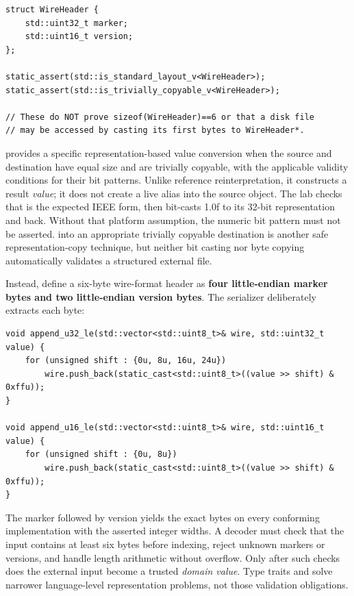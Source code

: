 \begin{verbatim}
struct WireHeader {
    std::uint32_t marker;
    std::uint16_t version;
};

static_assert(std::is_standard_layout_v<WireHeader>);
static_assert(std::is_trivially_copyable_v<WireHeader>);

// These do NOT prove sizeof(WireHeader)==6 or that a disk file
// may be accessed by casting its first bytes to WireHeader*.
\end{verbatim}

 provides a specific representation-based value conversion when the source and destination have equal size and are trivially copyable, with the applicable validity conditions for their bit patterns. Unlike reference reinterpretation, it constructs a result \emph{value}; it does not create a live alias into the source object. The lab checks that  is the expected IEEE form, then bit-casts 1.0f to its 32-bit representation  and back. Without that platform assumption, the numeric bit pattern must not be asserted.  into an appropriate trivially copyable destination is another safe representation-copy technique, but neither bit casting nor byte copying automatically validates a structured external file.

Instead, define a six-byte wire-format header as \textbf{four little-endian marker bytes and two little-endian version bytes}. The serializer deliberately extracts each byte:

\begin{verbatim}
void append_u32_le(std::vector<std::uint8_t>& wire, std::uint32_t value) {
    for (unsigned shift : {0u, 8u, 16u, 24u})
        wire.push_back(static_cast<std::uint8_t>((value >> shift) & 0xffu));
}

void append_u16_le(std::vector<std::uint8_t>& wire, std::uint16_t value) {
    for (unsigned shift : {0u, 8u})
        wire.push_back(static_cast<std::uint8_t>((value >> shift) & 0xffu));
}
\end{verbatim}

The marker  followed by version  yields the exact bytes  on every conforming implementation with the asserted integer widths. A decoder must check that the input contains at least six bytes before indexing, reject unknown markers or versions, and handle length arithmetic without overflow. Only after such checks does the external input become a trusted \emph{domain value}. Type traits and  solve narrower language-level representation problems, not those validation obligations.

